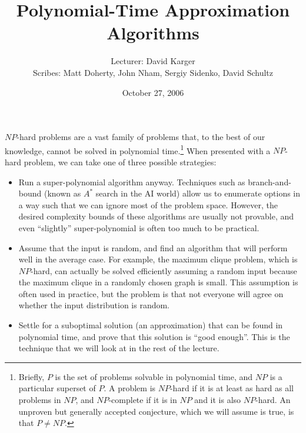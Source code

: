 \documentclass{article}
\title{Polynomial-Time Approximation Algorithms}
\date{October 27, 2006}
\author{Lecturer: David Karger\\ Scribes: Matt Doherty, John Nham, Sergiy Sidenko, David Schultz}
\begin{document}
%
%
%
%

%



$NP$-hard problems are a vast family of problems that, to the best of
our knowledge, cannot be solved in polynomial time.\footnote{Briefly, $P$ is the set of problems solvable in
  polynomial time, and $NP$ is a particular superset of $P$.  A
  problem is $NP$-hard if it is at least as hard as all problems in
  $NP$, and $NP$-complete if it is in $NP$ and it is also $NP$-hard.
  An unproven but generally accepted conjecture, which we will assume
  is true, is that $P\ne NP$.}  When presented with a $NP$-hard problem, we can take one of three possible strategies:

\begin{itemize}
\item Run a super-polynomial algorithm anyway.  Techniques such as
branch-and-bound (known as $A^*$ search in the AI world) allow us to
enumerate options in a way such that we can ignore most of the problem
space.  However, the desired complexity bounds of these algorithms are
usually not provable, and even ``slightly'' super-polynomial
is often too much to be practical.
\item
Assume that the input is random, and find an algorithm that will perform well in the average case. For example, the maximum clique problem, which is $NP$-hard, can actually be solved efficiently assuming a random input because the maximum clique in a randomly chosen graph is small. This assumption is often used in practice, but the problem is that not everyone will agree on whether the input distribution is random.
\item Settle for a suboptimal solution (an approximation) that can be
found in polynomial time, and prove that this solution is ``good
enough''.  This is the technique that we will look at in the rest of
the lecture.
\end{itemize}
\end{document}
